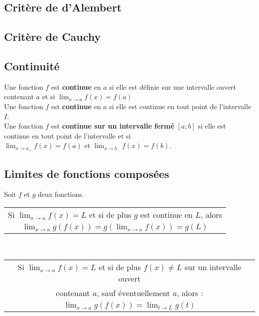 \documentclass[12pt, a4paper]{book}
\begin{document}
\subsection{Critère de d'Alembert}

\subsection{Critère de Cauchy}

\subsection{Continuité}
Une fonction $f$ est \textbf{continue} en $a$ si elle est définie sur une intervalle ouvert contenant $a$ et si $\lim_{x \to a}f(x) = f(a)$\\
Une fonction $f$ est \textbf{continue} en $a$ si elle est continue en tout point de l'intervalle $I$.\\
Une fonction $f$ est \textbf{continue sur un intervalle fermé} $[a;b]$ si elle est\\
continue en tout point de l'intervalle et si \\
$\lim_{x \to a_+}f(x) = f(a)$ et $\lim_{x \to b_-}f(x) = f(b)$.
\subsection{Limites de fonctions composées}
Soit $f$ et $g$ deux fonctions.
\begin{center}
    \begin{tabular}{|c|}
        \hline
        Si $\lim_{x \to a}f(x) = L$ et si de plus $g$ est continue en $L$, alors\\
        $\lim_{x \to a}g(f(x)) = g(\lim_{x \to a}f(x)) = g(L) $\\
        \hline
   \end{tabular}
   \newline \\
   \begin{tabular}{|c|}
    \hline
    Si $\lim_{x \to a}f(x) = L$ et si de plus $f(x) \not = L$ sur un intervalle ouvert\\
    contenant $a$, sauf éventuellement $a$, alors : \\
    $\lim_{x \to a}g(f(x)) = \lim_{t \to L}g(t)$\\
    \hline
\end{tabular}
\end{center}
\newpage
\end{document}
